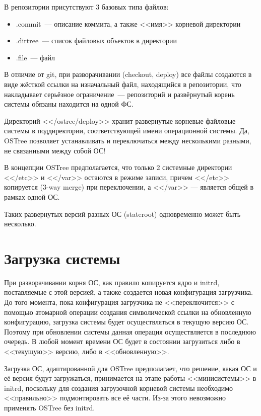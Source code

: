 \documentclass[10pt, a5paper]{article}
\begin{document}
В репозитории присутствуют 3 базовых типа файлов:

\begin{itemize}
  \item <sha256>.commit~--- описание коммита, а также <<имя>> корневой директории
  \item <sha256>.dirtree~--- список файловых объектов в директории
  \item <sha256>.file~--- файл
\end{itemize}

В отличие от git, при разворачивании (checkout, deploy) все файлы создаются в виде жёсткой ссылки на изначальный файл, находящийся в репозитории, что накладывает серьёзное ограничение~--- репозиторий и развёрнутый корень системы обязаны находится на одной ФС.

Директорий <</ostree/deploy>> хранит развернутые корневые файловые системы в поддиректории, соответствующей имени операционной системы. Да, OSTree позволяет устанавливать и переключаться между несколькими разными, не связанными между собой ОС!

В концепции OSTree предполагается, что только 2 системные директории <</etc>> и <</var>> остаются в режиме записи, причем <</etc>> копируется (3-way merge) при переключении, а <</var>> --- является общей в рамках одной ОС.

Таких развернутых версий разных ОС (stateroot) одновременно может быть несколько.

\section*{Загрузка системы}

При разворачивании корня ОС, как правило копируется ядро и initrd, поставляемые с этой версией, а также создается новая конфигурация загрузчика. До того момента, пока конфигурация загрузчика не <<переключится>> с помощью атомарной операции создания символической ссылки на обновленную конфигурацию, загрузка системы будет осуществляться в текущую версию ОС. Поэтому при обновлении системы данная операция осуществляется в последнюю очередь. В любой момент времени ОС будет в состоянии загрузиться либо в <<текущую>> версию, либо в <<обновленную>>.

Загрузка ОС, адаптированной для OSTree предполагает, что решение, какая ОС и её версия будут загружаться, принимается на этапе работы <<минисистемы>> в initrd, поскольку для создания загрузочной корневой системы необходимо <<правильно>> подмонтировать все её части. Из-за этого невозможно применять OSTree без initrd.
\end{document}
